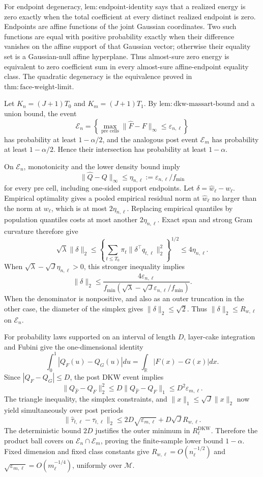 For endpoint degeneracy, \(\mathrm{lem:endpoint\mbox{-}identity}\) says that a realized energy is zero exactly when the total coefficient at every distinct realized endpoint is zero.  Endpoints are affine functions of the joint Gaussian coordinates.  Two such functions are equal with positive probability exactly when their difference vanishes on the affine support of that Gaussian vector; otherwise their equality set is a Gaussian-null affine hyperplane.  Thus almost-sure zero energy is equivalent to zero coefficient sum in every almost-sure affine-endpoint equality class.  The quadratic degeneracy is the equivalence proved in \(\mathrm{thm:face\mbox{-}weight\mbox{-}limit}\).

Let \(K_n=(J+1)T_0\) and \(K_m=(J+1)T_1\).  By \(\mathrm{lem:dkw\mbox{-}massart\mbox{-}bound}\) and a union bound, the event
\[
 \mathcal E_n=\left\{\max_{\text{pre cells}}
 \|\widehat F-F\|_\infty\leq\varepsilon_{n,\ell}\right\}
\]
has probability at least \(1-\alpha/2\), and the analogous post event \(\mathcal E_m\) has probability at least \(1-\alpha/2\).  Hence their intersection has probability at least \(1-\alpha\).

On \(\mathcal E_n\), monotonicity and the lower density bound imply
\[
 \|\widehat Q-Q\|_\infty\leq
 \eta_{n,\ell}:=\varepsilon_{n,\ell}/f_{\min}
\]
for every pre cell, including one-sided support endpoints.  Let \(\delta=\widehat w_\ell-w_\ell\).  Empirical optimality gives a pooled empirical residual norm at \(\widehat w_\ell\) no larger than the norm at \(w_\ell\), which is at most \(2\eta_{n,\ell}\).  Replacing empirical quantiles by population quantiles costs at most another \(2\eta_{n,\ell}\).  Exact span and strong Gram curvature therefore give
\[
 \sqrt\lambda\|\delta\|_2
 \leq\left\{\sum_{t\leq T_0}\pi_t
 \|\delta^\top q_{t,\ell}\|_2^2\right\}^{1/2}
 \leq4\eta_{n,\ell}.
\]
When \(\sqrt\lambda-\sqrt J\eta_{n,\ell}>0\), this stronger inequality implies
\[
 \|\delta\|_2\leq
 \frac{4\varepsilon_{n,\ell}}
 {f_{\min}(\sqrt\lambda-\sqrt J\varepsilon_{n,\ell}/f_{\min})}.
\]
When the denominator is nonpositive, and also as an outer truncation in the other case, the diameter of the simplex gives \(\|\delta\|_2\leq\sqrt2\).  Thus \(\|\delta\|_2\leq R_{w,\ell}\) on \(\mathcal E_n\).

For probability laws supported on an interval of length \(D\), layer-cake integration and Fubini give the one-dimensional identity
\[
 \int_0^1|Q_F(u)-Q_G(u)|du
 =\int_{\mathbb R}|F(x)-G(x)|dx.
\]
Since \(|Q_F-Q_G|\leq D\), the post DKW event implies
\[
 \|Q_{\widehat F}-Q_F\|_2^2
 \leq D\|Q_{\widehat F}-Q_F\|_1
 \leq D^2\varepsilon_{m,\ell}.
\]
The triangle inequality, the simplex constraints, and
\(\|x\|_1\leq\sqrt J\|x\|_2\) now yield simultaneously over post periods
\[
 \|\widehat\tau_{t,\ell}-\tau_{t,\ell}\|_2
 \leq2D\sqrt{\varepsilon_{m,\ell}}+D\sqrt J R_{w,\ell}.
\]
The deterministic bound \(2D\) justifies the outer minimum in
\(R^{\mathrm{DKW}}_\ell\).  Therefore the product ball covers on
\(\mathcal E_n\cap\mathcal E_m\), proving the finite-sample lower bound \(1-\alpha\).  Fixed dimension and fixed class constants give
\(R_{w,\ell}=O(n_\ell^{-1/2})\) and
\(\sqrt{\varepsilon_{m,\ell}}=O(m_\ell^{-1/4})\), uniformly over \(\mathcal M\).

